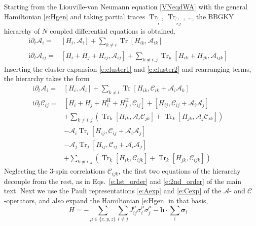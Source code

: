 \documentclass[aps,prl,showpacs,amsmath,amssymb,superscriptaddress,reprint,10pt]{revtex4-1}
\newcommand\ii{{\mathrm{i}}}
\newcommand{\mvec}[1]{\boldsymbol #1}
\newcommand{\Com}[2]{\left[{#1},{#2}\right]}
\DeclareMathOperator{\Tr}{{Tr}}
\begin{document}
Starting from the Liouville-von Neumann equation \eqref{VNeqdWA} with the general Hamiltonian \eqref{e:Hgen} and taking partial traces $\Tr_{\not{\,i}}$, $\Tr_{\not{\,i}\not{\,j}}$, \dots, the BBGKY hierarchy of $N$ coupled differential equations is obtained,
\begin{subequations}
\begin{align}
\ii\partial_t \mathscr{A}_i=&\Com{H_i}{\mathscr{A}_i}+\sum_{k\neq i}\Tr\Com{H_{ik}}{\mathscr{A}_{ik}}\label{e:1st_order_app1}\\
\ii\partial_t \mathscr{A}_{ij}=&\Com{H_i+H_j+H_{ij}}{\mathscr{A}_{ij}}+\sum_{k\neq i,j}\Tr_k\Com{H_{ik}+H_{jk}}{\mathscr{A}_{ijk}}
\label{e:2nd_order_app1}
\end{align}
\end{subequations}
Inserting the cluster expansion \eqref{e:cluster1} and \eqref{e:cluster2} and rearranging terms, the hierarchy takes the form 
\begin{subequations}
\begin{align}
\ii\partial_t \mathscr{A}_i=&\Com{H_i}{\mathscr{A}_i}+\sum_{k\neq i}\Tr\Com{H_{ik}}{\mathscr{C}_{ik}+\mathscr{A}_i \mathscr{A}_k}\label{e:1st_order_app2}\\
\ii\partial_t \mathscr{C}_{ij}=&\Com{H_i+H_j+H_i^\text{H}+H_j^\text{H}}{\mathscr{C}_{ij}}+\Com{H_{ij}}{\mathscr{C}_{ij}+\mathscr{A}_i \mathscr{A}_j}\nonumber\\
&+\sum_{k\neq i,j}\left(\Tr_k\Com{H_{ik}}{\mathscr{A}_i \mathscr{C}_{jk}}+\Tr_k\Com{H_{jk}}{\mathscr{A}_j \mathscr{C}_{ik}}\right)\nonumber\\
&-\mathscr{A}_i\Tr_i\Com{H_{ij}}{\mathscr{C}_{ij}+\mathscr{A}_i \mathscr{A}_j}\nonumber\\
&-\mathscr{A}_j\Tr_j\Com{H_{ij}}{\mathscr{C}_{ij}+\mathscr{A}_i \mathscr{A}_j}\nonumber\\
&+\sum_{k\neq i,j}\left(\Tr_k\Com{H_{ik}}{\mathscr{C}_{ijk}}+\Tr_k\Com{H_{jk}}{\mathscr{C}_{ijk}}\right)
\label{e:2nd_order_app2}
\end{align}
\end{subequations}
Neglecting the 3-spin correlations $\mathscr{C}_{ijk}$, the first two equations of the hierarchy decouple from the rest, as in Eqs.~\eqref{e:1st_order} and \eqref{e:2nd_order} of the main text. Next we use the Pauli representations \eqref{e:Aexp} and \eqref{e:Cexp} of the $\mathscr{A}$- and $\mathscr{C}$-operators, and also expand the Hamiltonian \eqref{e:Hgen} in that basis,
\begin{equation}
H=-\sum_{\mu\in\{x,y,z\}}\sum_{i\neq j}J_{ij}^\mu\sigma_i^\mu\sigma_j^\mu - \mvec{h}\cdot\sum_i\mvec{\sigma}_i
\end{equation}
\end{document}

